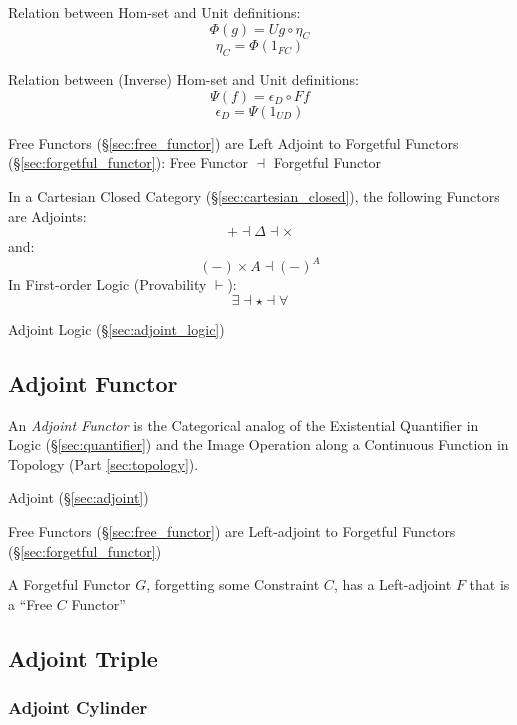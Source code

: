 Relation between Hom-set and Unit definitions:
\[
  \Phi(g) = U g \circ \eta_C
\]\[
  \eta_C = \Phi(1_{FC})
\]

Relation between (Inverse) Hom-set and Unit definitions:
\[
  \Psi (f) = \epsilon_D \circ F f
\]\[
  \epsilon_D = \Psi(1_{U D})
\]

Free Functors (\S\ref{sec:free_functor}) are Left Adjoint to Forgetful
Functors (\S\ref{sec:forgetful_functor}): Free Functor $\dashv$
Forgetful Functor

In a Cartesian Closed Category (\S\ref{sec:cartesian_closed}), the
following Functors are Adjoints:
\[
  + \dashv \Delta \dashv \times
\]
and:
\[
  (-) \times A \dashv (-)^A
\]
In First-order Logic (Provability $\vdash$):
\[
  \exists \dashv \star \dashv \forall
\]

Adjoint Logic (\S\ref{sec:adjoint_logic})



\subsection{Adjoint Functor}\label{sec:adjoint_functor}

An \emph{Adjoint Functor} is the Categorical analog of the Existential
Quantifier in Logic (\S\ref{sec:quantifier}) and the Image Operation
along a Continuous Function in Topology (Part \ref{sec:topology}).

Adjoint (\S\ref{sec:adjoint})

Free Functors (\S\ref{sec:free_functor}) are Left-adjoint to Forgetful
Functors (\S\ref{sec:forgetful_functor})

A Forgetful Functor $G$, forgetting some Constraint $C$, has a
Left-adjoint $F$ that is a ``Free $C$ Functor'' %



\subsection{Adjoint Triple}\label{sec:adjoint_triple}

\subsubsection{Adjoint Cylinder}\label{sec:adjoint_cylinder}

